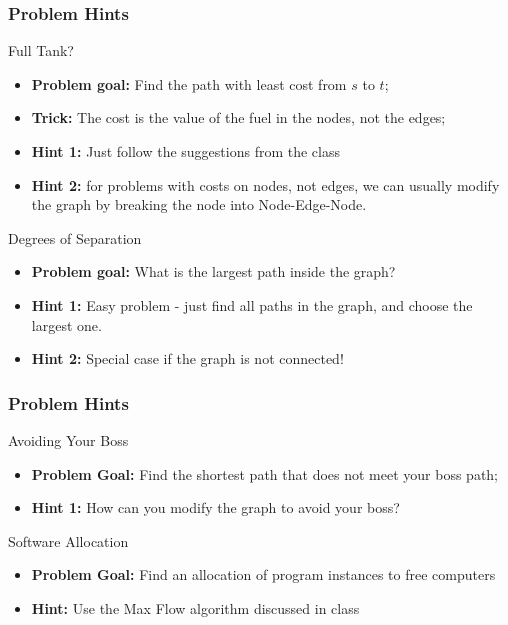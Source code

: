 \begin{frame}
  \frametitle{Problem Hints}
  \begin{block}{Full Tank?}
    \begin{itemize}
    \item {\bf Problem goal:} Find the path with least cost from $s$
      to $t$;
    \item {\bf Trick:} The cost is the value of the fuel in the nodes, not
      the edges;
    \item {\bf Hint 1:} Just follow the suggestions from the class
    \item {\bf Hint 2:} for problems with costs on nodes, not edges, we can
      usually modify the graph by breaking the node into Node-Edge-Node.
    \end{itemize}
  \end{block}
  \begin{exampleblock}{Degrees of Separation}
    \begin{itemize}
    \item {\bf Problem goal:} What is the largest path inside the graph?
    \item {\bf Hint 1:} Easy problem - just find all paths in the
      graph, and choose the largest one.
    \item {\bf Hint 2:} Special case if the graph is not connected!
    \end{itemize}
  \end{exampleblock}
\end{frame}

\begin{frame}
  \frametitle{Problem Hints}
  \begin{block}{Avoiding Your Boss}
    \begin{itemize}
    \item {\bf Problem Goal:} Find the shortest path that does not
      meet your boss path;
    \item {\bf Hint 1:} How can you modify the graph to avoid your
      boss?
    \end{itemize}
  \end{block}
  
  \begin{exampleblock}{Software Allocation}
    \begin{itemize}
    \item {\bf Problem Goal:} Find an allocation of program instances
      to free computers
    \item {\bf Hint:} Use the Max Flow algorithm discussed in class
    \end{itemize}
  \end{exampleblock}
\end{frame}

